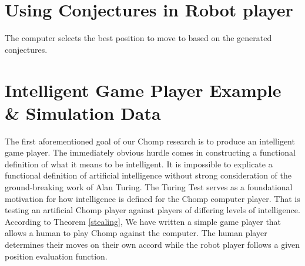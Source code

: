 \documentclass{amsart}
\theoremstyle{definition}
\theoremstyle{remark}
\numberwithin{equation}{section}
\begin{document}
\section{Using Conjectures in Robot player}
\label{conjecturing_player}

The computer selects the best position to move to based on the generated conjectures.






















\section{Intelligent Game Player Example \& Simulation Data}
\label{intelligent}
The first aforementioned goal of our Chomp research is to produce an intelligent game player. The immediately obvious hurdle comes in constructing a functional definition of what it means to be intelligent. It is impossible to explicate a functional definition of artificial intelligence without strong consideration of the ground-breaking work of Alan Turing. The Turing Test serves as a foundational motivation for how intelligence is defined for the Chomp computer player. That is testing an artificial Chomp player against players of differing levels of intelligence. According to Theorem \ref{stealing},  We have written a simple game player that allows a human to play Chomp against the computer.  The human player determines their moves on their own accord while the robot player follows a given position evaluation function.
\end{document}
